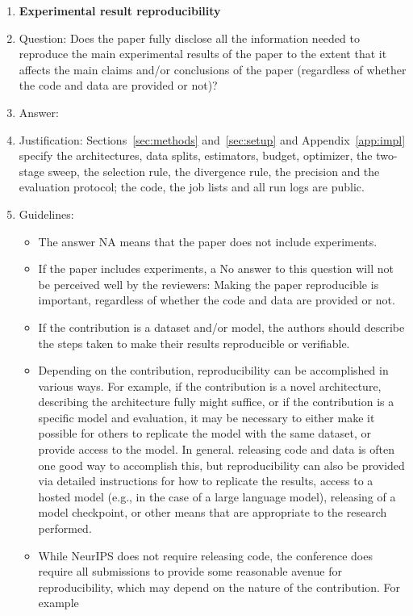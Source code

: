 \documentclass{article}
\begin{document}
\begin{enumerate}
    \item {\bf Experimental result reproducibility}
    \item[] Question: Does the paper fully disclose all the information needed to reproduce the main experimental results of the paper to the extent that it affects the main claims and/or conclusions of the paper (regardless of whether the code and data are provided or not)?
    \item[] Answer: \answerYes{}
    \item[] Justification: Sections~\ref{sec:methods} and~\ref{sec:setup} and Appendix~\ref{app:impl} specify the architectures, data splits, estimators, budget, optimizer, the two-stage sweep, the selection rule, the divergence rule, the precision and the evaluation protocol; the code, the job lists and all run logs are public.
    \item[] Guidelines:
    \begin{itemize}
        \item The answer NA means that the paper does not include experiments.
        \item If the paper includes experiments, a No answer to this question will not be perceived well by the reviewers: Making the paper reproducible is important, regardless of whether the code and data are provided or not.
        \item If the contribution is a dataset and/or model, the authors should describe the steps taken to make their results reproducible or verifiable.
        \item Depending on the contribution, reproducibility can be accomplished in various ways. For example, if the contribution is a novel architecture, describing the architecture fully might suffice, or if the contribution is a specific model and evaluation, it may be necessary to either make it possible for others to replicate the model with the same dataset, or provide access to the model. In general. releasing code and data is often one good way to accomplish this, but reproducibility can also be provided via detailed instructions for how to replicate the results, access to a hosted model (e.g., in the case of a large language model), releasing of a model checkpoint, or other means that are appropriate to the research performed.
        \item While NeurIPS does not require releasing code, the conference does require all submissions to provide some reasonable avenue for reproducibility, which may depend on the nature of the contribution. For example

\end{itemize}
\end{enumerate}
\end{document}
